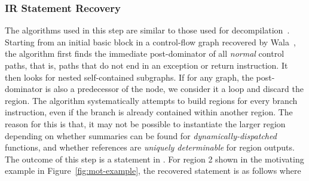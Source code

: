 \subsubsection{IR Statement Recovery}
%
 The algorithms used in this step are similar to those used for decompilation~\cite{Yakdan15@decompilation}. %
%
Starting from an initial basic block in a control-flow graph recovered by Wala~\cite{Wala}, the algorithm first finds
the immediate post-dominator of all {\em normal} control paths, that is, paths that do not end in an exception or return
instruction.
%
It then looks for nested self-contained subgraphs.
%
If for any graph, the post-dominator is also a predecessor of the node, we consider it a loop and discard the region.
%
The algorithm systematically attempts to build regions for every branch instruction, even if the branch is already
contained within another region.
%
The reason for this is that, it may not be possible to instantiate the larger region depending on whether summaries can be found
for {\em dynamically-dispatched} functions, and whether references are {\em uniquely determinable} for region outputs.
%
The outcome of this step is a statement in \tool.
%
For region 2 shown in the motivating example in Figure~\ref{fig:mot-example}, the recovered statement is as follows where
